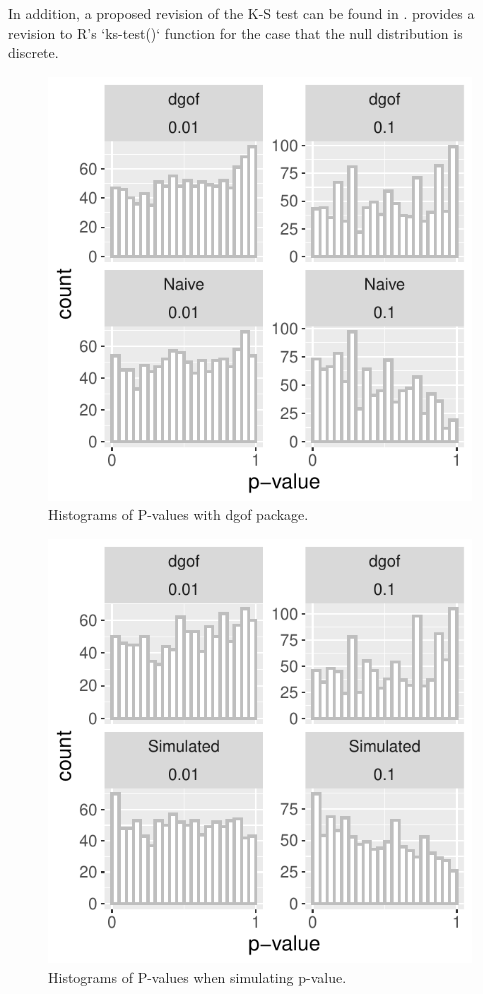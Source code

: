 \documentclass[12pt, letterpaper, titlepage]{article}
\begin{document}
In addition, a proposed revision of the K-S test can be found in \citet{dgof}.\citet{dgof} provides a revision to R's `ks-test()` function for the case that the null distribution is discrete.

\begin{figure}[!ht]
  \centering
  \includegraphics[scale=0.7]{hist_dgof}
  \caption{Histograms of P-values with dgof package.}
  \label{fig:hist_dgof}
\end{figure}

\begin{figure}[!ht]
  \centering
  \includegraphics[scale=0.7]{hist_dgofsim}
  \caption{Histograms of P-values when simulating p-value.}
  \label{fig:hist_dgofsim}
\end{figure}
\end{document}
